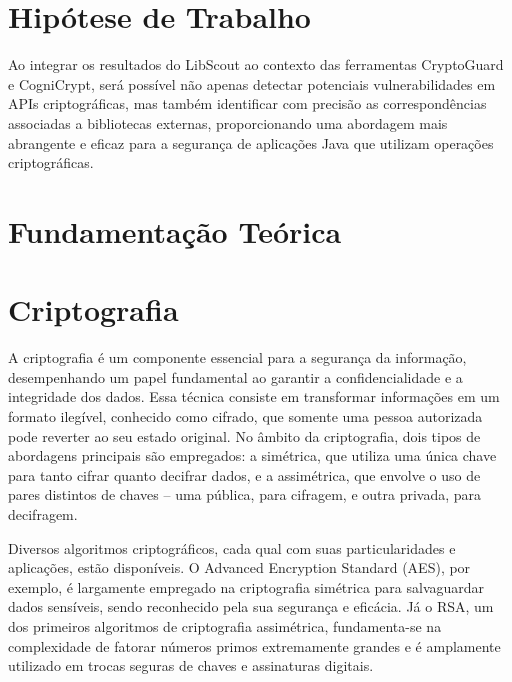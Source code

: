 \section{Hipótese de Trabalho}

Ao integrar os resultados do LibScout ao contexto das ferramentas CryptoGuard e CogniCrypt, será possível não apenas detectar potenciais vulnerabilidades em APIs criptográficas, mas também identificar com precisão as correspondências associadas a bibliotecas externas, proporcionando uma abordagem mais abrangente e eficaz para a segurança de aplicações Java que utilizam operações criptográficas.


\section{Fundamentação Teórica}

\section{Criptografia} %

A criptografia é um componente essencial para a segurança da informação, desempenhando um papel fundamental ao garantir a confidencialidade e a integridade dos dados. Essa técnica consiste em transformar informações em um formato ilegível, conhecido como cifrado, que somente uma pessoa autorizada pode reverter ao seu estado original. No âmbito da criptografia, dois tipos de abordagens principais são empregados: a simétrica, que utiliza uma única chave para tanto cifrar quanto decifrar dados, e a assimétrica, que envolve o uso de pares distintos de chaves – uma pública, para cifragem, e outra privada, para decifragem.

Diversos algoritmos criptográficos, cada qual com suas particularidades e aplicações, estão disponíveis. O Advanced Encryption Standard (AES), por exemplo, é largamente empregado na criptografia simétrica para salvaguardar dados sensíveis, sendo reconhecido pela sua segurança e eficácia. Já o RSA, um dos primeiros algoritmos de criptografia assimétrica, fundamenta-se na complexidade de fatorar números primos extremamente grandes e é amplamente utilizado em trocas seguras de chaves e assinaturas digitais.


